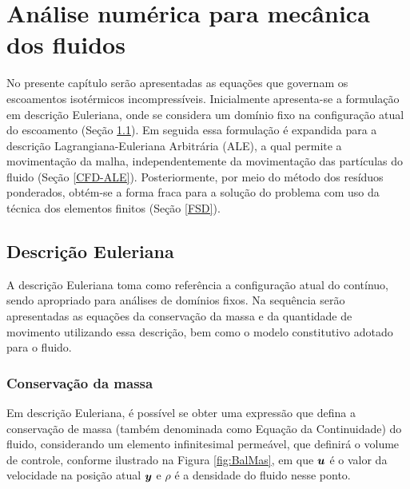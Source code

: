 \chapter{Análise numérica para mecânica dos fluidos} \label{EGDF}

No presente capítulo serão apresentadas as equações que governam os escoamentos isotérmicos incompressíveis. Inicialmente apresenta-se a formulação em descrição Euleriana, onde se considera um domínio fixo na configuração atual do escoamento (Seção \ref{CFD-E}). Em seguida essa formulação é expandida para a descrição Lagrangiana-Euleriana Arbitrária (ALE), a qual permite a movimentação da malha, independentemente da movimentação das partículas do fluido (Seção \ref{CFD-ALE}). Posteriormente, por meio do método dos resíduos ponderados, obtém-se a forma fraca para a solução do problema com uso da técnica dos elementos finitos (Seção \ref{FSD}).%

\section{Descrição Euleriana} \label{CFD-E}

A descrição Euleriana toma como referência a configuração atual do contínuo, sendo apropriado para análises de domínios fixos. Na sequência serão apresentadas as equações da conservação da massa e da quantidade de movimento utilizando essa descrição, bem como o modelo constitutivo adotado para o fluido.

\subsection{Conservação da massa}

Em descrição Euleriana, é possível se obter uma expressão que defina a conservação de massa (também denominada como Equação da Continuidade) do fluido, considerando um elemento infinitesimal permeável, que definirá o volume de controle, conforme ilustrado na Figura \ref{fig:BalMas}, em que $\boldsymbol{u}$ é o valor da velocidade na posição atual $\boldsymbol{y}$ e $\rho$ é a densidade do fluido nesse ponto.

